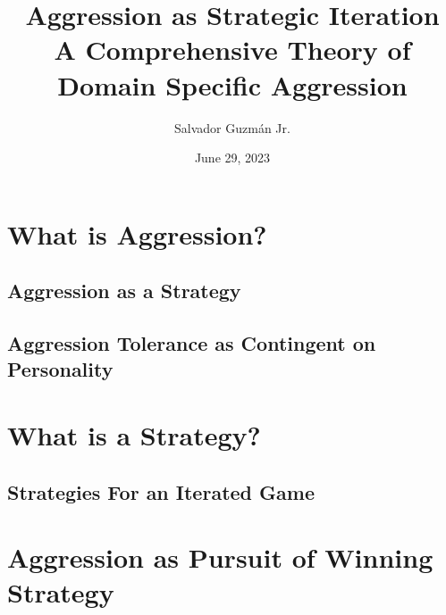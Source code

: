 \documentclass[12pt]{article}
\title{
 Aggression as Strategic Iteration \\
 \large A Comprehensive Theory of Domain Specific Aggression }
\author{Salvador Guzm\'an Jr.}
\date{June 29, 2023}
\begin{document}
\maketitle
\pagebreak

\begin{abstract}
\end{abstract}
\pagebreak
\tableofcontents
\pagebreak

\section{What is Aggression?}
\subsection{Aggression as a Strategy}
\subsection{Aggression Tolerance as Contingent on Personality}

\section{What is a Strategy?}
\subsection{Strategies For an Iterated Game}

\section{Aggression as Pursuit of Winning Strategy}
\end{document}

